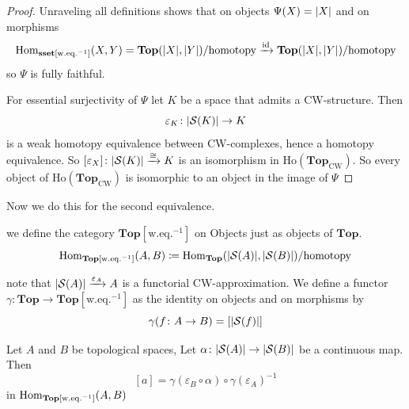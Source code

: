 \documentclass[language=english]{TemplateLecture}
\begin{document}
\begin{proof}
    Unraveling all definitions shows that on objects \(\Psi(X) = \lvert X\rvert\) and on morphisms
    \[\operatorname{Hom}_{\mathbf{sset}[\mathrm{w.eq.}^{ -1}]}(X, Y) = \mathbf{Top}(\lvert X\rvert, \lvert Y\rvert)/\text{homotopy} \xrightarrow{\operatorname{id}} \mathbf{Top}(\lvert X\rvert, \lvert Y\rvert)/\text{homotopy}\]
    so \(\Psi\) is fully faithful.

    For essential surjectivity of \(\Psi\) let \(K\) be a space that admits a CW-structure. Then
    \[\varepsilon_K\colon \lvert\mathcal{S}(K)\rvert \to K\]
    is a weak homotopy equivalence between CW-complexes, hence a homotopy equivalence. So \([\varepsilon_X]\colon \lvert\mathcal{S}(K)\rvert \xrightarrow{\cong} K\) is an isomorphism in \(\mathrm{Ho}(\mathbf{Top}_{\mathrm{CW}})\). So every object of \(\mathrm{Ho}(\mathbf{Top}_{\mathrm{CW}})\) is isomorphic to an object in the image of \(\Psi\)
\end{proof}

Now we do this for the second equivalence.

\begin{construction}
    we define the category \(\mathbf{Top}[\mathrm{w.eq.}^{-1}]\) on Objects just as objects of \(\mathbf{Top}\).
    \[\operatorname{Hom}_{\mathbf{Top}[\mathrm{w.eq.}^{-1}]}(A,B) \coloneq \operatorname{Hom}_{\mathbf{Top}}(\lvert\mathcal{S}(A)\rvert, \lvert\mathcal{S}(B)\rvert)/\text{homotopy}\]

    note that \(\lvert\mathcal{S}(A)\rvert\xrightarrow{\varepsilon_A} A\) is a functorial CW-approximation. We define a functor \(\gamma\colon \mathbf{Top} \to \mathbf{Top}[\mathrm{w.eq.}^{-1}]\) as the identity on objects and on morphisms by
    \[\gamma(f\colon A\to B) = [\lvert\mathcal{S}(f)\rvert]\]
\end{construction}

\begin{proposition}
    Let \(A\) and \(B\) be topological spaces, Let \(\alpha\colon \lvert\mathcal{S}(A)\rvert\to \lvert\mathcal{S}(B)\rvert\) be a continuous map. Then
    \[[a] = \gamma(\varepsilon_B \circ \alpha) \circ \gamma(\varepsilon_A)^{-1}\]
    in \(\operatorname{Hom}_{\mathbf{Top}[\mathrm{w.eq.}^{-1}]}(A,B)\)
\end{proposition}
\end{document}
